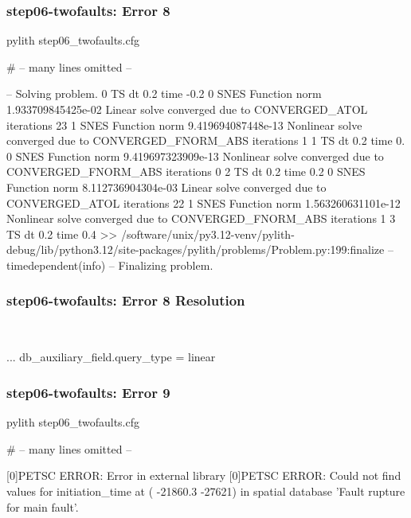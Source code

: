 \documentclass[aspectratio=169]{beamer}
\begin{document}
\begin{frame}[fragile]
  \frametitle{{\ttfamily step06-twofaults}: Error 8}

\begin{bashcode}
pylith step06_twofaults.cfg

# -- many lines omitted --

 -- Solving problem.
0 TS dt 0.2 time -0.2
    0 SNES Function norm 1.933709845425e-02
      Linear solve converged due to CONVERGED_ATOL iterations 23
    1 SNES Function norm 9.419694087448e-13
    Nonlinear solve converged due to CONVERGED_FNORM_ABS iterations 1
1 TS dt 0.2 time 0.
    0 SNES Function norm 9.419697323909e-13
    Nonlinear solve converged due to CONVERGED_FNORM_ABS iterations 0
2 TS dt 0.2 time 0.2
    0 SNES Function norm 8.112736904304e-03
      Linear solve converged due to CONVERGED_ATOL iterations 22
    1 SNES Function norm 1.563260631101e-12
    Nonlinear solve converged due to CONVERGED_FNORM_ABS iterations 1
3 TS dt 0.2 time 0.4
 >> /software/unix/py3.12-venv/pylith-debug/lib/python3.12/site-packages/pylith/problems/Problem.py:199:finalize
 -- timedependent(info)
 -- Finalizing problem.
\end{bashcode}

\end{frame}


\begin{frame}[t,fragile]
  \frametitle{{\ttfamily step06-twofaults}: Error 8 Resolution}

  \tserror\par

  \pause\\[1pt]

  \begin{cfgcode}
    ...
    db_auxiliary_field.query_type = linear
  \end{cfgcode}

\end{frame}


\begin{frame}[fragile]
  \frametitle{{\ttfamily step06-twofaults}: Error 9}

\begin{bashcode}
pylith step06_twofaults.cfg

# -- many lines omitted --

[0]PETSC ERROR: Error in external library
[0]PETSC ERROR: Could not find values for initiation_time at (  -21860.3  -27621) in spatial database 'Fault rupture for main fault'.
\end{bashcode}

\end{frame}
\end{document}
